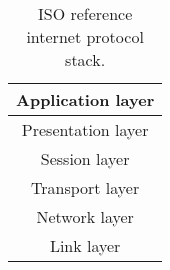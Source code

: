 \begin{table}
    \centering
    \caption{ISO reference internet protocol stack.}
    \label{tab:iso_stack}
    \begin{tabular}{c}
        \toprule
        Application layer \\
        \midrule
        Presentation layer \\
        \midrule
        Session layer \\
        \midrule
        Transport layer \\
        \midrule
        Network layer \\
        \midrule
        Link layer \\
        \bottomrule
    \end{tabular}
\end{table}
